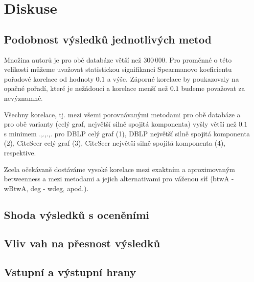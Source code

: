 \documentclass{bakalarka}
\begin{document}
\chapter{Diskuse}
\section{Podobnost výsledků jednotlivých metod}
Množina autorů je pro obě databáze větší než 300\,000. Pro proměnné o této
velikosti můžeme uvažovat statistickou signifikanci Spearmanovo koeficientu
pořadové korelace od hodnoty $0.1$ a výše. Záporné korelace by poukazovaly na
opačné pořadí, které je nežádoucí a korelace menší než $0.1$ budeme považovat
za nevýznamné.

Všechny korelace, tj. mezi všemi porovnávanými metodami pro obě databáze a pro
obě varianty (celý graf, největší silně spojitá komponenta) vyšly větší než
$0.1$ s minimem .,.,.,. pro DBLP celý graf (1), DBLP největší silně spojitá
komponenta (2), CiteSeer celý graf (3), CiteSeer největší silně spojitá
komponenta (4), respektive.

Zcela očekávaně dostáváme vysoké korelace mezi exaktním a aproximovaným
betweenness a mezi metodami a jejich alternativami pro váženou síť (btwA -
wBtwA, deg - wdeg, apod.).



\section{Shoda výsledků s oceněními}
\section{Vliv vah na přesnost výsledků}
\section{Vstupní a výstupní hrany}
\end{document}

